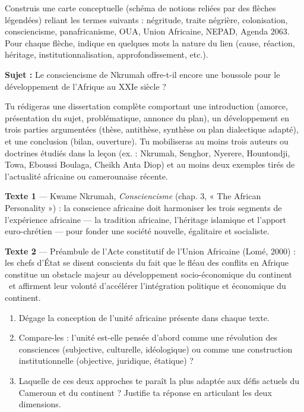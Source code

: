 \documentclass[11pt]{article}
\newcommand{\cle}[1]{{\popxbold\color{popdark}#1}}
\newcounter{popsec}
\newcounter{popsub}
\newcommand{\courssub}[1]{%
  \stepcounter{popsub}%
  \par\vspace{9pt}\noindent{\popxbold\fontsize{11.5}{13}\selectfont\color{popink}{\color{poporange}\thepopsec.\thepopsub}\hspace{6pt}#1}\par\nopagebreak\vspace{4pt}
}
\begin{document}
\begin{exercice}
Construis une carte conceptuelle (schéma de notions reliées par des flèches légendées) reliant les termes suivants : \cle{négritude}, \cle{traite négrière}, \cle{colonisation}, \cle{consciencisme}, \cle{panafricanisme}, \cle{OUA}, \cle{Union Africaine}, \cle{NEPAD}, \cle{Agenda 2063}. Pour chaque flèche, indique en quelques mots la nature du lien (cause, réaction, héritage, institutionnalisation, approfondissement, etc.).
\end{exercice}

\courssub{Je me prépare au Bac}

\begin{exercice}
\textbf{Sujet :} Le consciencisme de Nkrumah offre-t-il encore une boussole pour le développement de l'Afrique au XXIe siècle ?

Tu rédigeras une dissertation complète comportant une introduction (amorce, présentation du sujet, problématique, annonce du plan), un développement en trois parties argumentées (thèse, antithèse, synthèse ou plan dialectique adapté), et une conclusion (bilan, ouverture). Tu mobiliseras au moins trois auteurs ou doctrines étudiés dans la leçon (ex. : Nkrumah, Senghor, Nyerere, Hountondji, Towa, Eboussi Boulaga, Cheikh Anta Diop) et au moins deux exemples tirés de l'actualité africaine ou camerounaise récente.
\end{exercice}

\begin{exercice}
\textbf{Texte 1} — Kwame Nkrumah, \emph{Consciencisme} (chap. 3, « The African Personality ») : la conscience africaine doit harmoniser les trois segments de l'expérience africaine — la tradition africaine, l'héritage islamique et l'apport euro-chrétien — pour fonder une société nouvelle, égalitaire et socialiste.

\textbf{Texte 2} — Préambule de l'Acte constitutif de l'Union Africaine (Lomé, 2000) : les chefs d'État se disent \guillemotleft conscients du fait que le fléau des conflits en Afrique constitue un obstacle majeur au développement socio-économique du continent \guillemotright\ et affirment leur volonté d'accélérer l'intégration politique et économique du continent.

\begin{enumerate}
\item Dégage la conception de l'unité africaine présente dans chaque texte.
\item Compare-les : l'unité est-elle pensée d'abord comme une révolution des consciences (subjective, culturelle, idéologique) ou comme une construction institutionnelle (objective, juridique, étatique) ?
\item Laquelle de ces deux approches te paraît la plus adaptée aux défis actuels du Cameroun et du continent ? Justifie ta réponse en articulant les deux dimensions.
\end{enumerate}
\end{exercice}
\end{document}
